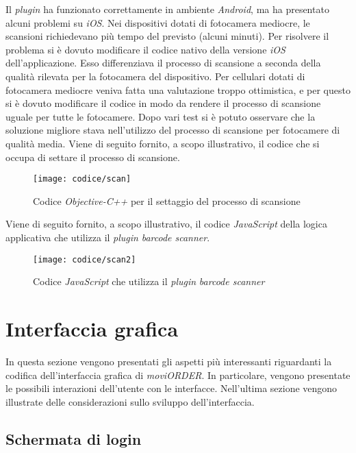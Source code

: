Il \textit{plugin} ha funzionato correttamente in ambiente \textit{Android}, ma ha presentato alcuni problemi su \textit{iOS}. Nei dispositivi dotati di fotocamera mediocre, le scansioni richiedevano più tempo del previsto (alcuni minuti). Per risolvere il problema si è dovuto modificare il codice nativo della versione \textit{iOS} dell'applicazione. Esso differenziava il processo di scansione a seconda della qualità rilevata per la fotocamera del dispositivo. Per cellulari dotati di fotocamera mediocre veniva fatta una valutazione troppo ottimistica, e per questo si è dovuto modificare il codice in modo da rendere il processo di scansione uguale per tutte le fotocamere. Dopo vari test si è potuto osservare che la soluzione migliore stava nell'utilizzo del processo di scansione per fotocamere di qualità media. Viene di seguito fornito, a scopo illustrativo, il codice  che si occupa di settare il processo di scansione.

\begin{figure}[!h] 
    \centering 
    \texttt{[image: codice/scan]} 
    \caption{Codice \textit{Objective-C++} per il settaggio del processo di scansione}
\end{figure}

\newpage

Viene di seguito fornito, a scopo illustrativo, il codice \textit{JavaScript} della logica applicativa che utilizza il \textit{plugin} \textit{barcode scanner}.

\begin{figure}[!h] 
    \centering 
    \texttt{[image: codice/scan2]} 
    \caption{Codice \textit{JavaScript} che utilizza il \textit{plugin} \textit{barcode scanner}}
\end{figure}

\newpage

\section{Interfaccia grafica}

In questa sezione vengono presentati gli aspetti più interessanti riguardanti la codifica dell'interfaccia grafica di \textit{moviORDER}. In particolare, vengono presentate le possibili interazioni dell'utente con le interfacce. Nell'ultima sezione vengono illustrate delle considerazioni sullo sviluppo dell'interfaccia.

\subsection{Schermata di login}

